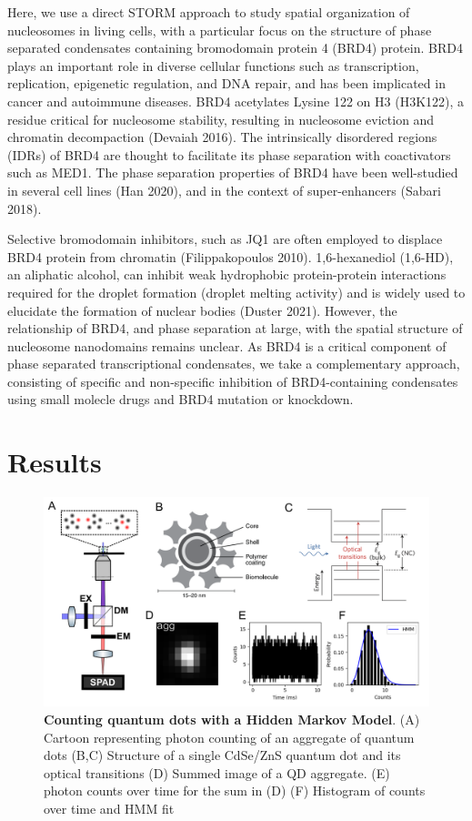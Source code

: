 \documentclass{ucetd}
\begin{document}
Here, we use a direct STORM approach to study spatial organization of nucleosomes in living cells, with a particular focus on the structure of phase separated condensates containing bromodomain protein 4 (BRD4) protein. BRD4 plays an important role in diverse cellular functions such as transcription, replication, epigenetic regulation, and DNA repair, and has been implicated in cancer and autoimmune diseases. BRD4 acetylates Lysine 122 on H3 (H3K122), a residue critical for nucleosome stability, resulting in nucleosome eviction and chromatin decompaction (Devaiah 2016). The intrinsically disordered regions (IDRs) of BRD4 are thought to facilitate its phase separation with coactivators such as MED1. The phase separation properties of BRD4 have been well-studied in several cell lines (Han 2020), and in the context of super-enhancers (Sabari 2018).

Selective bromodomain inhibitors, such as JQ1 are often employed to displace BRD4 protein from chromatin (Filippakopoulos 2010). 1,6-hexanediol (1,6-HD), an aliphatic alcohol, can inhibit weak hydrophobic protein-protein interactions required for the droplet formation (droplet melting activity) and is widely used to elucidate the formation of nuclear bodies (Duster 2021). However, the relationship of BRD4, and phase separation at large, with the spatial structure of nucleosome nanodomains remains unclear. As BRD4 is a critical component of phase separated transcriptional condensates, we take a complementary approach, consisting of specific and non-specific inhibition of BRD4-containing condensates using small molecle drugs and BRD4 mutation or knockdown.


\section{Results}

\begin{figure}
\begin{center}
\includegraphics[width=14cm]{QD-Counting.png}
\end{center}
\caption{\textbf{Counting quantum dots with a Hidden Markov Model}. (A) Cartoon representing photon counting of an aggregate of quantum dots (B,C) Structure of a single CdSe/ZnS quantum dot and its optical transitions (D) Summed image of a QD aggregate. (E) photon counts over time for the sum in (D) (F) Histogram of counts over time and HMM fit}
\end{figure}
\end{document}
